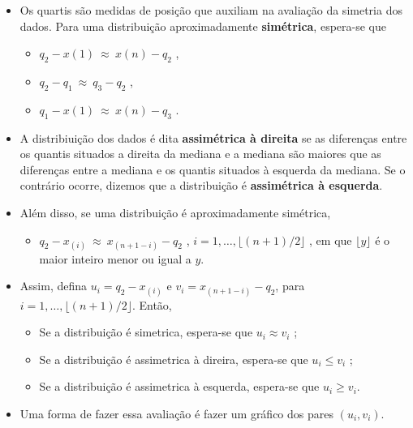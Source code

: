\documentclass[
]{book}
\providecommand{\tightlist}{%
  \setlength{\itemsep}{0pt}\setlength{\parskip}{0pt}}
\begin{document}
\begin{itemize}
\item
  Os quartis são medidas de posição que auxiliam na avaliação da simetria dos dados. Para uma distribuição aproximadamente \textbf{simétrica}, espera-se que

  \begin{itemize}
  \tightlist
  \item
    \(q_2 - x(1) ~\approx~ x(n)-q_2\) ,\\
  \item
    \(q_2 - q_1 ~\approx~ q_3-q_2\) ,\\
  \item
    \(q_1 - x(1) ~\approx~ x(n)-q_3\) .
  \end{itemize}
\item
  A distribiuição dos dados é dita \textbf{assimétrica à direita} se as diferenças entre os quantis situados a direita da mediana e a mediana são maiores que as diferenças entre a mediana e os quantis situados à esquerda da mediana. Se o contrário ocorre, dizemos que a distribuição é \textbf{assimétrica à esquerda}.
\item
  Além disso, se uma distribuição é aproximadamente simétrica,

  \begin{itemize}
  \tightlist
  \item
    \(q_2-x_{(i)} ~\approx~ x_{(n+1-i)}-q_2\) , \(i=1,\ldots,\lfloor(n+1)/2\rfloor\) , em que \(\lfloor y \rfloor\) é o maior inteiro menor ou igual a \(y\).
  \end{itemize}
\item
  Assim, defina \(u_i = q_2-x_{(i)}\) e \(v_i = x_{(n+1-i)}-q_2\), para \(i=1,\ldots,\lfloor(n+1)/2\rfloor\). Então,

  \begin{itemize}
  \tightlist
  \item
    Se a distribuição é simetrica, espera-se que \(u_i \approx v_i\) ;
  \item
    Se a distribuição é assimetrica à direira, espera-se que \(u_i \leq v_i\) ;
  \item
    Se a distribuição é assimetrica à esquerda, espera-se que \(u_i \geq v_i\).
  \end{itemize}
\item
  Uma forma de fazer essa avaliação é fazer um gráfico dos pares \((u_i,v_i)\).
\end{itemize}
\end{document}
